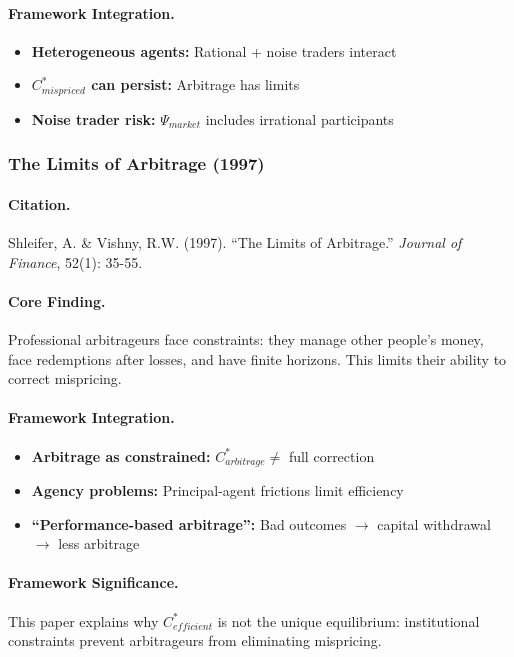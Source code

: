 \paragraph{Framework Integration.}
\begin{itemize}
  \item \textbf{Heterogeneous agents:} Rational + noise traders interact
  \item \textbf{$C^*_{mispriced}$ can persist:} Arbitrage has limits
  \item \textbf{Noise trader risk:} $\Psi_{market}$ includes irrational participants
\end{itemize}

\subsubsection{The Limits of Arbitrage (1997)}

\paragraph{Citation.}
Shleifer, A. \& Vishny, R.W. (1997).
``The Limits of Arbitrage.'' \emph{Journal of Finance}, 52(1): 35-55.

\paragraph{Core Finding.}
Professional arbitrageurs face constraints: they manage other people's money,
face redemptions after losses, and have finite horizons. This limits their
ability to correct mispricing.

\paragraph{Framework Integration.}
\begin{itemize}
  \item \textbf{Arbitrage as constrained:} $C^*_{arbitrage} \neq$ full correction
  \item \textbf{Agency problems:} Principal-agent frictions limit efficiency
  \item \textbf{``Performance-based arbitrage'':} Bad outcomes $\to$ capital withdrawal $\to$ less arbitrage
\end{itemize}

\paragraph{Framework Significance.}
This paper explains why $C^*_{efficient}$ is not the unique equilibrium:
institutional constraints prevent arbitrageurs from eliminating mispricing.

